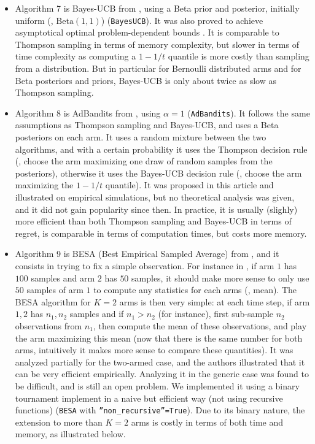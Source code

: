 \begin{itemize}
    \item Algorithm 7 is
    Bayes-UCB from \cite{Kaufmann12BUCB}, using a Beta prior and posterior, initially uniform (\ie, $\mathrm{Beta}(1,1)$) (\texttt{BayesUCB}).
    It was also proved to achieve asymptotical optimal problem-dependent bounds \cite{Kaufmann12BUCB}.
    It is comparable to Thompson sampling in terms of memory complexity, but slower in terms of time complexity as computing a $1-1/t$ quantile is more costly than sampling from a distribution.
    But in particular for Bernoulli distributed arms and for Beta posteriors and priors, Bayes-UCB is only about twice as slow as Thompson sampling.

    \item Algorithm 8 is
    AdBandits from \cite{Truzzi13}, using $\alpha=1$ (\texttt{AdBandits}).
    It follows the same assumptions as Thompson sampling and Bayes-UCB, and uses a Beta posteriors on each arm. It uses a random mixture between the two algorithms, and with a certain probability it uses the Thompson decision rule (\ie, choose the arm maximizing one draw of random samples from the posteriors), otherwise it uses the Bayes-UCB decision rule (\ie, choose the arm maximizing the $1-1/t$ quantile).
    It was proposed in this article and illustrated on empirical simulations, but no theoretical analysis was given, and it did not gain popularity since then.
    In practice, it is usually (slighly) more efficient than both Thompson sampling and Bayes-UCB in terms of regret, is comparable in terms of computation times, but costs more memory.

    \item Algorithm 9 is
    BESA (Best Empirical Sampled Average) from \cite{Baransi2014}, and it consists in trying to fix a simple observation.
    For instance in \UCB, if arm $1$ has $100$ samples and arm $2$ has $50$ samples, it should make more sense to only use $50$ samples of arm $1$ to compute any statistics for each arms (\eg, mean).
    The BESA algorithm for $K=2$ arms is then very simple: at each time step, if arm $1,2$ has $n_1,n_2$ samples and if $n_1>n_2$ (for instance), first sub-sample $n_2$ observations from $n_1$, then compute the mean of these observations, and play the arm maximizing this mean (now that there is the same number for both arms, intuitively it makes more sense to compare these quantities).
    It was analyzed partially for the two-armed case, and the authors illustrated that it can be very efficient empirically.
    Analyzing it in the generic case was found to be difficult, and is still an open problem.
    We implemented it using a binary tournament implement in a naive but efficient way (not using recursive functions) (\texttt{BESA} with \texttt{''non\_recursive''=True}).
    Due to its binary nature, the extension to more than $K=2$ arms is costly in terms of both time and memory, as illustrated below.
\end{itemize}

